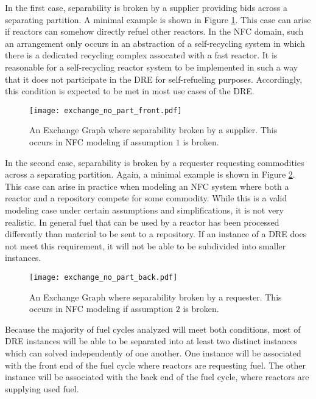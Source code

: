 In the first case, separability is broken by a supplier providing bids across a
separating partition. A minimal example is shown in Figure
\ref{fig:no_part_front}. This case can arise if reactors can somehow directly
refuel other reactors. In the NFC domain, such an arrangement only occurs in an
abstraction of a self-recycling system in which there is a dedicated recycling
complex assocated with a fast reactor. It is reasonable for a self-recycling
reactor system to be implemented in such a way that it does not participate in
the DRE for self-refueling purposes. Accordingly, this condition is expected to
be met in most use cases of the DRE.

\begin{figure}
  \begin{center}
    \texttt{[image: exchange\_no\_part\_front.pdf]}
    \caption[]{
      \label{fig:no_part_front}
      An Exchange Graph where separability broken by a supplier. This occurs in
      NFC modeling if assumption $1$ is broken.}
  \end{center}
\end{figure}

In the second case, separability is broken by a requester requesting commodities
across a separating partition. Again, a minimal example is shown in Figure
\ref{fig:no_part_back}. This case can arise in practice when modeling an NFC
system where both a reactor and a repository compete for some commodity. While
this is a valid modeling case under certain assumptions and simplifications, it
is not very realistic. In general fuel that can be used by a reactor has been
processed differently than material to be sent to a repository. If an instance
of a DRE does not meet this requirement, it will not be able to be subdivided
into smaller instances.

\begin{figure}
  \begin{center}
    \texttt{[image: exchange\_no\_part\_back.pdf]}
    \caption[]{
      \label{fig:no_part_back}
      An Exchange Graph where separability broken by a requester. This occurs in
      NFC modeling if assumption $2$ is broken.}
  \end{center}
\end{figure}

Because the majority of fuel cycles analyzed will meet both conditions, most of
DRE instances will be able to be separated into at least two distinct instances
which can solved independently of one another. One instance will be associated
with the front end of the fuel cycle where reactors are requesting fuel. The
other instance will be associated with the back end of the fuel cycle, where
reactors are supplying used fuel.

